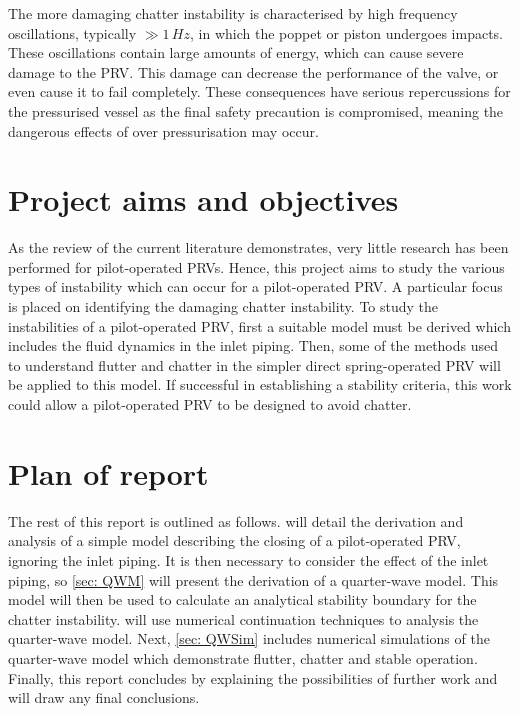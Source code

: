 The more damaging chatter instability is characterised by high frequency oscillations, typically $\gg 1 \, \si{Hz}$, in which the poppet or piston undergoes impacts. These oscillations contain large amounts of energy, which can cause severe damage to the PRV. This damage can decrease the performance of the valve, or even cause it to fail completely. These consequences have serious repercussions for the pressurised vessel as the final safety precaution is compromised, meaning the dangerous effects of over pressurisation may occur.




\section{Project aims and objectives}

As the review of the current literature demonstrates, very little research has been performed for pilot-operated PRVs. Hence, this project aims to study the various types of instability which can occur for a pilot-operated PRV. A particular focus is placed on identifying the damaging chatter instability. To study the instabilities of a pilot-operated PRV, first a suitable model must be derived which includes the fluid dynamics in the inlet piping. Then, some of the methods used to understand flutter and chatter in the simpler direct spring-operated PRV will be applied to this model. If successful in establishing a stability criteria, this work could allow a pilot-operated PRV to be designed to avoid chatter.

\section{Plan of report}

The rest of this report is outlined as follows.  will detail the derivation and analysis of a simple model describing the closing of a pilot-operated PRV, ignoring the inlet piping. It is then necessary to consider the effect of the inlet piping, so \cref{sec: QWM} will present the derivation of a quarter-wave model. This model will then be used to calculate an analytical stability boundary for the chatter instability.  will use numerical continuation techniques to analysis the quarter-wave model. Next, \cref{sec: QWSim} includes numerical simulations of the quarter-wave model which demonstrate flutter, chatter and stable operation. Finally, this report concludes by explaining the possibilities of further work and will draw any final conclusions.

